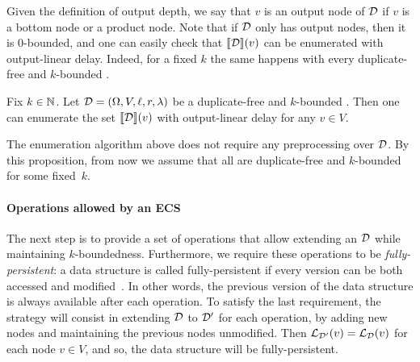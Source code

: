 Given the definition of output depth, we say that $v$ is an output node of $\mathcal{D}$ if $v$ is a bottom node or a product node. 
Note that if $\mathcal{D}$ only has output nodes, then it is 0-bounded, and one can easily check that ${\llbracket{\mathcal{D}}\rrbracket}(v)$ can be enumerated with output-linear delay.
Indeed, for a fixed $k$ the same happens with every duplicate-free and $k$-bounded \dsabbr{}.


\begin{proposition}\label{nested:ds:lindelay}
	Fix $k\in\mathbb{N}$. Let $\mathcal{D} = (\Omega, V, \ell, r, \lambda)$ be a duplicate-free and $k$-bounded \dsabbr{}. Then one can enumerate the set ${\llbracket{\mathcal{D}}\rrbracket}(v)$ with output-linear delay for any $v\in V$.
\end{proposition}

The enumeration algorithm above does not require any preprocessing over $\mathcal{D}$. By this proposition, from now we assume that all \dsabbr{} are duplicate-free and $k$-bounded for some fixed~$k$.




\paragraph{Operations allowed by an ECS}
The next step is to provide a set of operations that allow extending an \dsabbr{} $\mathcal{D}$ while maintaining $k$-boundedness. Furthermore, we require these operations to be \emph{fully-persistent}: a data structure is called fully-persistent if every version can be both accessed and modified~\cite{driscoll1986making}. In other words, the previous version of the data structure is always available after each operation.
To satisfy the last requirement, the strategy will consist in extending $\mathcal{D}$ to $\mathcal{D}'$ for each operation, by adding new nodes and maintaining the previous nodes unmodified. Then $\mathcal{L}_{\mathcal{D}'}(v) = \mathcal{L}_{\mathcal{D}}(v)$ for each node $v \in V$, and so, the data structure will be fully-persistent. 

